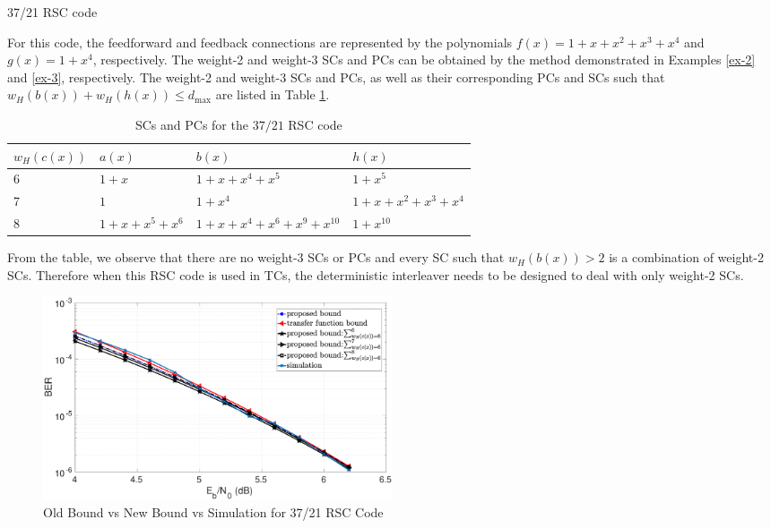 \begin{example}{37/21 RSC code}

For this code, the feedforward and feedback connections are represented by the polynomials $f(x)=1+x+x^2+x^3+x^4$ and $g(x)=1+x^4$, respectively. The weight-2 and weight-3 SCs and PCs can be obtained by the method demonstrated in Examples \ref{ex-2} and \ref{ex-3}, respectively. The weight-2 and weight-3 SCs and PCs, as well as their corresponding PCs and SCs such that $w_H(b(x))+w_H(h(x)) \leq d_{\text{max}}$ are listed in Table \ref{novelTab14}.
\begin{table}[htbp]
	\caption{SCs and PCs for the $37/21$ RSC code}
	\centering
	\begin{tabularx}{0.75\textwidth}{Xlll} 
		\hline
		$w_H(c(x))$&$a(x)$ & $b(x)$ & $h(x)$ \\ [0.5ex] 
		\hline\hline
		6&$1+x$ & $1+x+x^{4}+x^5$ & $1+x^5$\\
		\hline\hline
		7&$1$ & $1+x^4$ & $1+x+x^2+x^3+x^4$\\
		\hline\hline
		8&$1+x+x^5+x^6$ & $1+x+x^4+x^6+x^9+x^{10}$ & $1+x^{10}$\\
		\hline
	\end{tabularx}
	
	\label{novelTab14}
\end{table}

From the table, we observe that there are no weight-3 SCs or PCs and every SC such that $w_H(b(x)) > 2$ is a combination of weight-2 SCs. Therefore when this RSC code is used in TCs, the deterministic interleaver needs to be designed to deal with only weight-2 SCs.
\begin{figure}[htbp]
	\centering
	\includegraphics[width=0.5\textwidth]{./Images/RSC_37_21_lower_weights2.eps}
	\caption{Old Bound vs New Bound vs Simulation for 37/21 RSC Code}
	\label{simFig2}
\end{figure}


\end{example}
